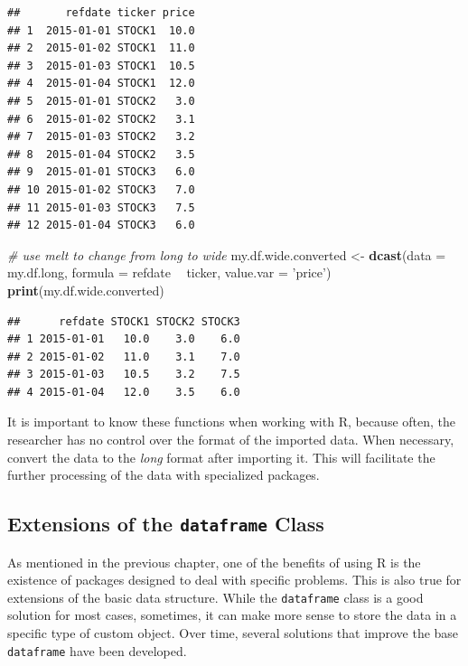 \documentclass[11pt,]{book}
\newenvironment{Shaded}{\begin{snugshade}}{\end{snugshade}}
\newcommand{\KeywordTok}[1]{\textcolor[rgb]{0.27,0.27,0.27}{\textbf{#1}}}
\newcommand{\DataTypeTok}[1]{\textcolor[rgb]{0.27,0.27,0.27}{#1}}
\newcommand{\StringTok}[1]{\textcolor[rgb]{0.5,0.5,0.5}{#1}}
\newcommand{\CommentTok}[1]{\textcolor[rgb]{0.56,0.35,0.01}{\textit{#1}}}
\newcommand{\OperatorTok}[1]{\textcolor[rgb]{0.81,0.36,0.00}{\textbf{#1}}}
\newcommand{\NormalTok}[1]{#1}
\begin{document}
\begin{verbatim}
##       refdate ticker price
## 1  2015-01-01 STOCK1  10.0
## 2  2015-01-02 STOCK1  11.0
## 3  2015-01-03 STOCK1  10.5
## 4  2015-01-04 STOCK1  12.0
## 5  2015-01-01 STOCK2   3.0
## 6  2015-01-02 STOCK2   3.1
## 7  2015-01-03 STOCK2   3.2
## 8  2015-01-04 STOCK2   3.5
## 9  2015-01-01 STOCK3   6.0
## 10 2015-01-02 STOCK3   7.0
## 11 2015-01-03 STOCK3   7.5
## 12 2015-01-04 STOCK3   6.0
\end{verbatim}

\begin{Shaded}
\begin{Highlighting}[]
\CommentTok{# use melt to change from long to wide}
\NormalTok{my.df.wide.converted <-}\StringTok{ }\KeywordTok{dcast}\NormalTok{(}\DataTypeTok{data =}\NormalTok{ my.df.long, }
                              \DataTypeTok{formula =}\NormalTok{ refdate }\OperatorTok{~}\StringTok{ }\NormalTok{ticker, }
                              \DataTypeTok{value.var =} \StringTok{'price'}\NormalTok{)}
\KeywordTok{print}\NormalTok{(my.df.wide.converted)}
\end{Highlighting}
\end{Shaded}

\begin{verbatim}
##      refdate STOCK1 STOCK2 STOCK3
## 1 2015-01-01   10.0    3.0    6.0
## 2 2015-01-02   11.0    3.1    7.0
## 3 2015-01-03   10.5    3.2    7.5
## 4 2015-01-04   12.0    3.5    6.0
\end{verbatim}

It is important to know these functions when working with R, because
often, the researcher has no control over the format of the imported
data. When necessary, convert the data to the \emph{long} format after
importing it. This will facilitate the further processing of the data
with specialized packages.

\subsection{\texorpdfstring{Extensions of the \texttt{dataframe}
Class}{Extensions of the dataframe Class}}\label{extensions-of-the-dataframe-class}

As mentioned in the previous chapter, one of the benefits of using R is
the existence of packages designed to deal with specific problems. This
is also true for extensions of the basic data structure. While the
\texttt{dataframe} class is a good solution for most cases, sometimes,
it can make more sense to store the data in a specific type of custom
object. Over time, several solutions that improve the base
\texttt{dataframe} have been developed.
\end{document}
